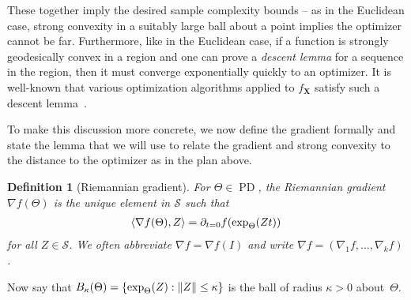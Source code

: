 \documentclass{article}
\newtheorem{definition}{Definition}
\DeclarePairedDelimiter{\norm}{\lVert}{\rVert}
\renewcommand{\vec}{\bm}
\newcommand\PD{\operatorname{PD}}
\newcommand\Sym{\mathcal{S}}
\begin{document}
These together imply the desired sample complexity bounds -- as in the Euclidean case, strong convexity in a suitably large ball about a point implies the optimizer cannot be far.
Furthermore, like in the Euclidean case, if a function is strongly geodesically convex in a region and one can prove a \emph{descent lemma} for a sequence in the region, then it must converge exponentially quickly to an optimizer.
It is well-known that various optimization algorithms applied to $f_{\vec X}$ satisfy such a descent lemma~\cite{burgisser2019towards}.

To make this discussion more concrete, we now define the gradient formally and state the lemma that we will use to relate the gradient and strong convexity to the distance to the optimizer as in the plan above.

\begin{definition}[Riemannian gradient]
For $\Theta \in \PD$, the \emph{Riemannian gradient}~$\nabla f(\Theta)$ is the unique element in $\Sym$ such that
\begin{align*}
  \braket{\nabla f(\Theta), Z} = \partial_{t=0} f(\exp_{\Theta}(Zt))
\end{align*}
for all $Z\in \Sym$.
We often abbreviate $\nabla f = \nabla f(I)$ and write $\nabla f = (\nabla_1 f, \dots, \nabla_k f)$.
\end{definition}

\noindent
Now say that $B_\kappa(\Theta) = \{ \exp_{\Theta}(Z) : \norm Z \leq \kappa \}$ is the ball of radius $\kappa>0$ about~$\Theta$.
\end{document}
